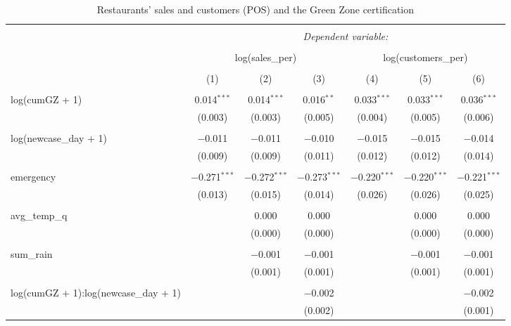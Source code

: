 
\begin{table}[!htbp] \centering 
  \caption{Restaurants' sales and customers (POS) and the Green Zone certification} 
  \label{} 
\begin{tabular}{@{\extracolsep{5pt}}lcccccc} 
\\[-1.8ex]\hline 
\hline \\[-1.8ex] 
 & \multicolumn{6}{c}{\textit{Dependent variable:}} \\ 
\cline{2-7} 
\\[-1.8ex] & \multicolumn{3}{c}{log(sales\_per)} & \multicolumn{3}{c}{log(customers\_per)} \\ 
\\[-1.8ex] & (1) & (2) & (3) & (4) & (5) & (6)\\ 
\hline \\[-1.8ex] 
 log(cumGZ + 1) & 0.014$^{***}$ & 0.014$^{***}$ & 0.016$^{**}$ & 0.033$^{***}$ & 0.033$^{***}$ & 0.036$^{***}$ \\ 
  & (0.003) & (0.003) & (0.005) & (0.004) & (0.005) & (0.006) \\ 
  & & & & & & \\ 
 log(newcase\_day + 1) & $-$0.011 & $-$0.011 & $-$0.010 & $-$0.015 & $-$0.015 & $-$0.014 \\ 
  & (0.009) & (0.009) & (0.011) & (0.012) & (0.012) & (0.014) \\ 
  & & & & & & \\ 
 emergency & $-$0.271$^{***}$ & $-$0.272$^{***}$ & $-$0.273$^{***}$ & $-$0.220$^{***}$ & $-$0.220$^{***}$ & $-$0.221$^{***}$ \\ 
  & (0.013) & (0.015) & (0.014) & (0.026) & (0.026) & (0.025) \\ 
  & & & & & & \\ 
 avg\_temp\_q &  & 0.000 & 0.000 &  & 0.000 & 0.000 \\ 
  &  & (0.000) & (0.000) &  & (0.000) & (0.000) \\ 
  & & & & & & \\ 
 sum\_rain &  & $-$0.001 & $-$0.001 &  & $-$0.001 & $-$0.001 \\ 
  &  & (0.001) & (0.001) &  & (0.001) & (0.001) \\ 
  & & & & & & \\ 
 log(cumGZ + 1):log(newcase\_day + 1) &  &  & $-$0.002 &  &  & $-$0.002 \\ 
  &  &  & (0.002) &  &  & (0.001) \\ 

\end{tabular}
\end{table}
